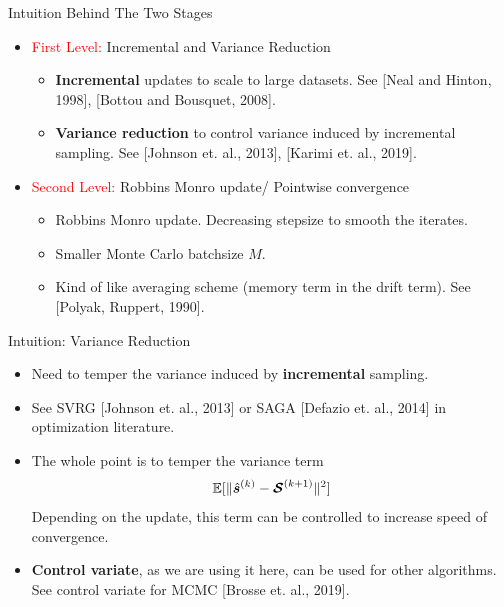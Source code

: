 \documentclass[10pt]{beamer}
\begin{document}
\begin{frame}{Intuition Behind The Two Stages}

\begin{itemize}
\item \textcolor{red}{First Level:} Incremental and Variance Reduction
\begin{itemize}
\item \textbf{Incremental} updates to scale to large datasets. See [Neal and Hinton, 1998], [Bottou and Bousquet, 2008].
\item \textbf{Variance reduction} to control variance induced by incremental sampling. See [Johnson et. al., 2013], [Karimi et. al., 2019].
\end{itemize}
\item \textcolor{red}{Second Level:} Robbins Monro update/ Pointwise convergence
\begin{itemize}
\item Robbins Monro update. Decreasing stepsize to smooth the iterates.
\item Smaller Monte Carlo batchsize $M$.
\item Kind of like averaging scheme (memory term in the drift term). See [Polyak, Ruppert, 1990].
\end{itemize}
\end{itemize}

\end{frame}



\begin{frame}{Intuition: Variance Reduction}

\begin{itemize}
\item Need to temper the variance induced by \textbf{incremental} sampling.
\item See SVRG [Johnson et. al., 2013] or SAGA [Defazio et. al., 2014] in optimization literature.
\item The whole point is to temper the variance term 
$$
\mathbb{E}[ \| \hat{\bm s}^{(k)} - {\bm{\mathcal{S}}}^{(k+1)} \|^2 ]
$$
Depending on the update, this term can be controlled to increase speed of convergence.
\item \textbf{Control variate}, as we are using it here, can be used for other algorithms. See control variate for MCMC [Brosse et. al., 2019].
\end{itemize}

\end{frame}
\end{document}
